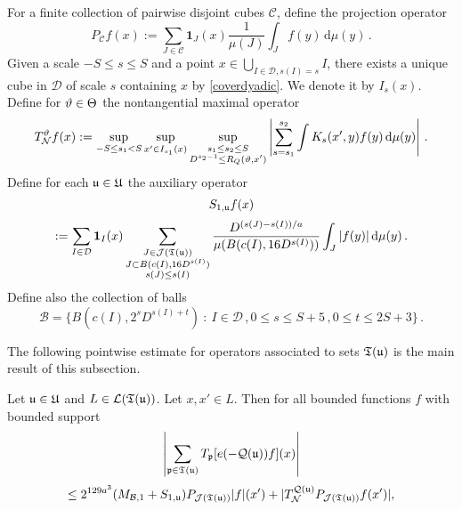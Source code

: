 For a finite collection of pairwise disjoint cubes $\mathcal{C}$, define the projection operator
$$
    P_{\mathcal{C}}f(x) :=\sum_{J\in\mathcal{C}}\mathbf{1}_J(x) \frac{1}{\mu(J)}\int_J f(y) \, \mathrm{d}\mu(y)\,.
$$
Given a scale $-S \le s\le S$ and a point $x \in \bigcup_{I\in \mathcal{D}, s(I) = s} I$, there exists a unique cube in $\mathcal{D}$ of scale $s$ containing $x$ by \eqref{coverdyadic}. We denote it by $I_s(x)$. Define for ${\vartheta} \in {\Theta}$ the nontangential maximal operator
\begin{equation}
    \label{eq-TN-def}
    T_{\mathcal{N}}^{\vartheta} f(x) := \sup_{-S \le s_1 < S} \sup_{x' \in I_{s_1}(x)} \sup_{\substack{s_1 \le s_2 \le S\\ D^{s_2-1} \le R_Q({\vartheta}, x')}} \left| \sum_{s = s_1}^{s_2} \int K_s(x',y) f(y) \, \mathrm{d}\mu(y) \right|\,.
\end{equation}
Define for each ${\mathfrak u} \in {\mathfrak U}$ the auxiliary operator
$$
    S_{1,{\mathfrak u}}f(x)
$$
\begin{equation}
    \label{eq-def-S-op}
    :=\sum_{I\in\mathcal{D}} \mathbf{1}_{I}(x) \sum_{\substack{J\in \mathcal{J}({\mathfrak T}({\mathfrak u}))\\
    J\subset B(c(I), 16 D^{s(I)})\\ s(J) \le s(I)}} \frac{D^{(s(J) - s(I))/a}}{\mu(B(c(I), 16D^{s(I)}))}\int_J |f(y)| \, \mathrm{d}\mu(y)\,.
\end{equation}
Define also the collection of balls
$$
    \mathcal{B} = \{B(c(I), 2^s D^{s(I)+t}) \ : \ I \in \mathcal{D}\,, 0 \le s \le S + 5\,, 0 \le t \le 2S+3\}\,.
$$

The following pointwise estimate for operators associated to sets ${\mathfrak T}({\mathfrak u})$ is the main result of this subsection.

\begin{lemma}
    \label{pointwise-tree-estimate}
    \leanok
    Let ${\mathfrak u} \in {\mathfrak U}$ and $L \in \mathcal{L}({\mathfrak T}({\mathfrak u}))$. Let $x, x' \in L$.
    Then for all bounded functions $f$ with bounded support
    $$
        \left|\sum_{{\mathfrak p} \in {\mathfrak T}({\mathfrak u})} T_{{\mathfrak p}}[ e(-{\mathcal{Q}}({\mathfrak u}))f](x)\right|
    $$
    \begin{equation}
        \label{eq-LJ-ptwise}
        \leq 2^{129a^3}(M_{\mathcal{B},1}+S_{1,{\mathfrak u}})P_{\mathcal{J}({\mathfrak T}({\mathfrak u}))}|f|(x')+|T_{\mathcal{N}}^{{\mathcal{Q}}({\mathfrak u})} P_{\mathcal{J}({\mathfrak T}({\mathfrak u}))}f(x')|,
    \end{equation}
\end{lemma}

